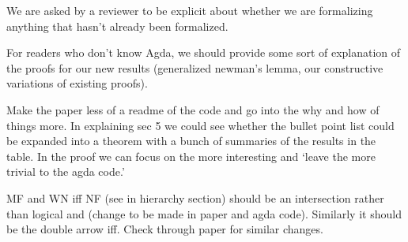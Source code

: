 \documentclass{article}
\begin{document}
\begin{todolist}
    \item We are asked by a reviewer to be explicit about whether we are formalizing anything that hasn't already been formalized.
    \item For readers who don't know Agda, we should provide some sort of explanation of the proofs for our new results (generalized newman's lemma, our constructive variations of existing proofs).
    \item Make the paper less of a readme of the code and go into the why and how of things more. In explaining sec 5 we could see whether the bullet point list could be expanded into a theorem with a bunch of summaries of the results in the table. In the proof we can focus on the more interesting and `leave the more trivial to the agda code.'
    \item  MF and WN iff NF (see in hierarchy section) should be an intersection rather than logical and (change to be made in paper and agda code). Similarly it should be the double arrow iff. Check through paper for similar changes.  
    

\end{todolist}
\end{document}
